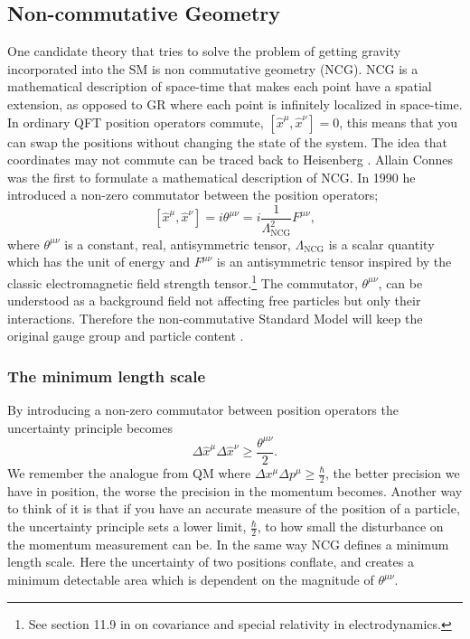 \subsection{Non-commutative Geometry}
One candidate theory that tries to solve the problem of getting gravity incorporated into the SM is non commutative geometry (NCG). NCG is a mathematical description of space-time that makes each point have a spatial extension, as opposed to GR where each point is infinitely localized in space-time. In ordinary QFT position operators commute, $[ \hat x^{\mu}, \hat x^{\nu}] = 0$, this means that you can swap the positions without changing the state of the system. The idea that coordinates may not commute can be traced back to Heisenberg \cite{snyder1947qst}. Allain Connes \cite{connes1991pma} was the first to formulate a mathematical description of NCG. In 1990 he introduced a non-zero commutator between the position operators; \cite{rosendahl2008} 
\begin{equation} \label{eq:ncgtheta}
	[ \hat x^{\mu}, \hat x^{\nu}] = i \theta^{\mu \nu} = i \frac{1}{\Lambda_{\textrm{NCG}}^2} F^{\mu\nu},
\end{equation}
where $\theta^{\mu \nu}$ is a constant, real, antisymmetric tensor, $\Lambda_{\textrm{NCG}}$ is a scalar quantity which has the unit of energy and $F^{\mu\nu}$ is an antisymmetric tensor inspired by the classic electromagnetic field strength tensor.\footnote{See section 11.9 in \cite{jackson1975cew} on covariance and special relativity in electrodynamics.} The commutator, $\theta^{\mu \nu}$, can be understood as a background field not affecting free particles but only their interactions. Therefore the non-commutative Standard Model will keep the original gauge group and particle content \cite{rosendahl2008}.

\subsubsection{The minimum length scale}
By introducing a non-zero commutator between position operators the uncertainty principle becomes
\begin{equation}
\Delta \hat x^{\mu} \Delta \hat x^{\nu} \ge \frac{\theta^{\mu \nu}}{2}.
\end{equation}
We remember the analogue from QM where $\Delta x^{\mu} \Delta p^{\mu} \ge \frac{\hbar}{2}$, the better precision we have in position, the worse the precision in the momentum becomes. Another way to think of it is that if you have an accurate measure of the position of a particle, the uncertainty principle sets a lower limit, $\frac{\hbar}{2}$, to how small the disturbance on the momentum measurement can be. In the same way NCG defines a minimum length scale. Here the uncertainty of two positions conflate, and creates a minimum detectable area which is dependent on the magnitude of $\theta^{\mu \nu}$.

